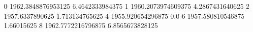 0 1962.3848876953125 6.4642333984375
1 1960.2073974609375 4.2867431640625
2 1957.6337890625 1.713134765625
4 1955.920654296875 0.0
6 1957.580810546875 1.66015625
8 1962.7772216796875 6.8565673828125
